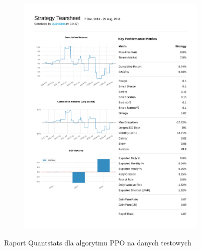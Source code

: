 \documentclass[12pt,a4paper]{article}
\begin{document}
\begin{figure}[ht!]
\begin{subfigure}[ht!]{0.45\textwidth}
    \includegraphics[page=3, width=\textwidth]{plots/qs_ppo.pdf}
  \end{subfigure}
  \caption{Raport Quantstats dla algorytmu PPO na
    danych testowych}
\end{figure}
\end{document}
